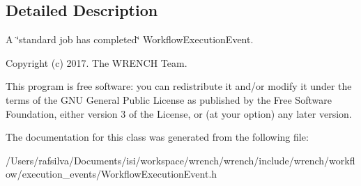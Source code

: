 \subsection{Detailed Description}
A \char`\"{}standard job has completed\char`\"{} Workflow\+Execution\+Event. 

Copyright (c) 2017. The W\+R\+E\+N\+CH Team.

This program is free software\+: you can redistribute it and/or modify it under the terms of the G\+NU General Public License as published by the Free Software Foundation, either version 3 of the License, or (at your option) any later version. 

The documentation for this class was generated from the following file\+:\begin{DoxyCompactItemize}
\item 
/\+Users/rafsilva/\+Documents/isi/workspace/wrench/wrench/include/wrench/workflow/execution\+\_\+events/Workflow\+Execution\+Event.\+h\end{DoxyCompactItemize}
